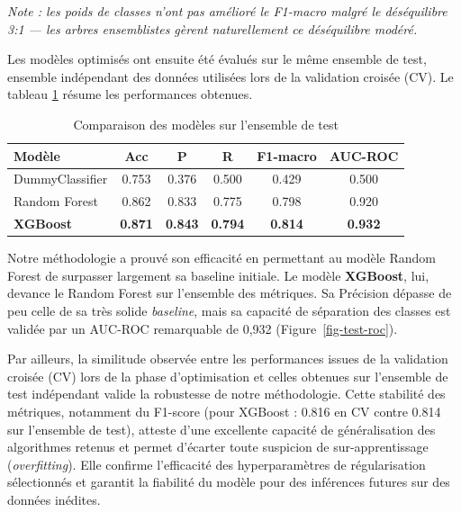 \documentclass[10pt, a4paper]{article}
\begin{document}
\medskip

\noindent\textit{Note : les poids de classes n'ont pas amélioré le F1-macro malgré le déséquilibre 3:1 --- les arbres ensemblistes gèrent naturellement ce déséquilibre modéré.}

\medskip

Les modèles optimisés ont ensuite été évalués sur le même ensemble de test, ensemble indépendant des données utilisées lors de la validation croisée (CV). Le tableau \ref{tab-resultats} résume les performances obtenues.

\begin{table}[htb]
\centering
\caption{Comparaison des modèles sur l'ensemble de test}
\label{tab-resultats}
\begin{tabular}{lccccc}
\toprule
\textbf{Modèle} & \textbf{Acc} & \textbf{P} & \textbf{R} & \textbf{F1-macro} & \textbf{AUC-ROC} \\
\midrule
DummyClassifier          & 0.753 & 0.376 & 0.500 & 0.429 & 0.500 \\
Random Forest            & 0.862 & 0.833 & 0.775 & 0.798 & 0.920 \\
\textbf{XGBoost}         & \textbf{0.871} & \textbf{0.843} & \textbf{0.794} & \textbf{0.814} & \textbf{0.932} \\
\bottomrule
\end{tabular}
\end{table}

Notre méthodologie a prouvé son efficacité en permettant au modèle Random Forest de surpasser largement sa baseline initiale.
Le modèle \textbf{XGBoost}, lui, devance le Random Forest sur l'ensemble des métriques. Sa Précision dépasse de peu celle de sa très solide \textit{baseline}, mais sa capacité de séparation des classes est validée par un AUC-ROC remarquable de 0,932 (Figure~\ref{fig-test-roc}).

Par ailleurs, la similitude observée entre les performances issues de la validation croisée (CV) lors de la phase d'optimisation et celles obtenues sur l'ensemble de test indépendant valide la robustesse de notre méthodologie. Cette stabilité des métriques, notamment du F1-score (pour XGBoost : 0.816 en CV contre 0.814 sur l'ensemble de test), atteste d'une excellente capacité de généralisation des algorithmes retenus et permet d'écarter toute suspicion de sur-apprentissage (\textit{overfitting}). Elle confirme l'efficacité des hyperparamètres de régularisation sélectionnés et garantit la fiabilité du modèle pour des inférences futures sur des données inédites.
\end{document}

